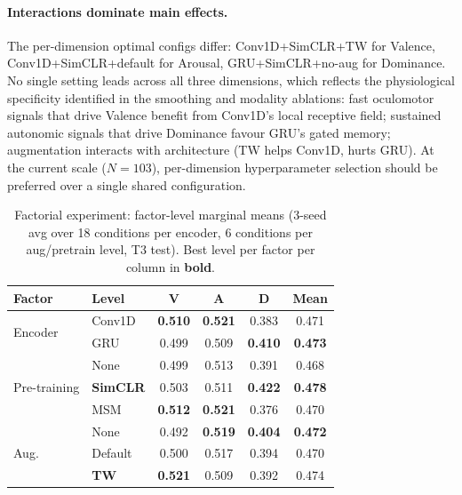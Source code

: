 \documentclass[sigconf,nonacm]{acmart}
\begin{document}
\paragraph{Interactions dominate main effects.}
The per-dimension optimal configs differ:
Conv1D\allowbreak{}+SimCLR\allowbreak{}+TW for Valence,
Conv1D\allowbreak{}+SimCLR\allowbreak{}+default for Arousal,
GRU\allowbreak{}+SimCLR\allowbreak{}+no-aug for Dominance.
No single setting leads across all three dimensions, which reflects the
physiological specificity identified in the smoothing and modality ablations:
fast oculomotor signals that drive Valence benefit from Conv1D's local
receptive field; sustained autonomic signals that drive Dominance favour
GRU's gated memory; augmentation interacts with architecture
(TW helps Conv1D, hurts GRU).
At the current scale ($N{=}103$), per-dimension hyperparameter selection
should be preferred over a single shared configuration.

\begin{table}[t]
\caption{Factorial experiment: factor-level marginal means (3-seed avg
over 18 conditions per encoder, 6 conditions per aug/pretrain level, T3 test).
Best level per factor per column in \textbf{bold}.}
\label{tab:factorial_marginals}
\centering
\setlength{\tabcolsep}{8pt}
\small
\begin{tabular}{llcccc}
\toprule
\textbf{Factor} & \textbf{Level} & \textbf{V} & \textbf{A} & \textbf{D} & \textbf{Mean} \\
\midrule
\multirow{2}{*}{Encoder}
  & Conv1D & \textbf{0.510} & \textbf{0.521} & 0.383 & 0.471 \\
  & GRU    & 0.499 & 0.509 & \textbf{0.410} & \textbf{0.473} \\
\midrule
\multirow{3}{*}{Pre-training}
  & None   & 0.499 & 0.513 & 0.391 & 0.468 \\
  & \textbf{SimCLR} & 0.503 & 0.511 & \textbf{0.422} & \textbf{0.478} \\
  & MSM    & \textbf{0.512} & \textbf{0.521} & 0.376 & 0.470 \\
\midrule
\multirow{3}{*}{Aug.}
  & None    & 0.492 & \textbf{0.519} & \textbf{0.404} & \textbf{0.472} \\
  & Default & 0.500 & 0.517 & 0.394 & 0.470 \\
  & \textbf{TW}  & \textbf{0.521} & 0.509 & 0.392 & 0.474 \\
\bottomrule
\end{tabular}
\end{table}
\end{document}
